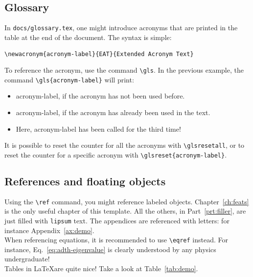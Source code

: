 \subsection{Glossary}

In \texttt{docs/glossary.tex}, one might introduce acronyms that are printed in the table at the end of the document. The syntax is simple:

\begin{center}
    \texttt{\textbackslash newacronym\{acronym-label\}\{EAT\}\{Extended Acronym Text\}}
\end{center}

To reference the acronym, use the command \texttt{\textbackslash gls}. 
In the previous example, the command \texttt{\textbackslash gls\{acronym-label\}} will print:
\begin{itemize}
    \item \gls{acronym-label}, if the acronym has not been used before.
    \item \gls{acronym-label}, if the acronym has already been used in the text.
    \item Here, \gls{acronym-label} has been called for the third time!
\end{itemize}

It is possible to reset the counter for all the acronyms with \texttt{\textbackslash glsresetall}, or to reset the counter for a specific acronym with \texttt{\textbackslash glsreset\{acronym-label\}}.




\subsection{References and floating objects}

Using the \texttt{\textbackslash ref} command, you might reference labeled objects.
Chapter~\ref{ch:feats} is the only useful chapter of this template.
All the others, in Part~\ref{prt:filler}, are just filled with \texttt{lipsum} text.
The appendices are referenced with letters: for instance Appendix~\ref{ax:demo}.\\

When referencing equations, it is recommended to use \texttt{\textbackslash eqref} instead. 
For instance, Eq.~\eqref{eq:adth-eigenvalue} is clearly understood by any physics undergraduate!\\

Tables in \LaTeX are quite nice! Take a look at Table~\ref{tab:demo}.\\

